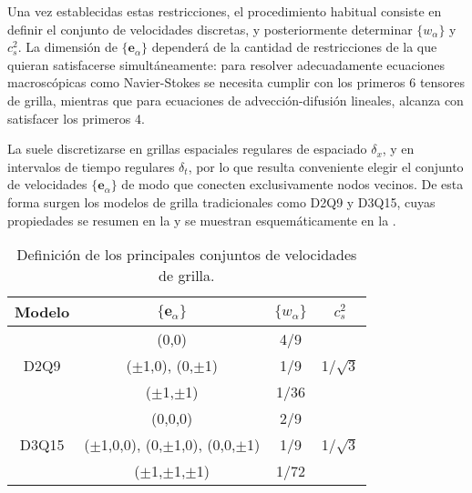 Una vez establecidas estas restricciones, el procedimiento habitual consiste en definir el conjunto de velocidades discretas, y posteriormente determinar $\{w_{\alpha}\}$ y $c_s^2$. La dimensi\'on de $\{ \bm{e}_{\alpha}\}$ depender\'a de la cantidad de restricciones de la  que quieran satisfacerse simult\'aneamente: para resolver adecuadamente ecuaciones macrosc\'opicas como Navier-Stokes se necesita cumplir con los primeros 6 tensores de grilla, mientras que para ecuaciones de advecci\'on-difusi\'on lineales, alcanza con satisfacer los primeros 4.
\par
La  suele discretizarse en grillas espaciales regulares de espaciado $\delta_x$, y en intervalos de tiempo regulares $\delta_t$, por lo que resulta conveniente elegir el conjunto de velocidades $\{ \bm{e}_{\alpha} \}$ de modo que conecten exclusivamente nodos vecinos. De esta forma surgen los modelos de grilla tradicionales como D2Q9 y D3Q15, cuyas propiedades se resumen en la  y se muestran esquem\'aticamente en la .

\begin{table}[ht]
	\centering
    \begin{tabular}{c c c c}
	    \toprule
        \bf Modelo & $\{\bm{e}_{\alpha}\}$ & $\{w_{\alpha}\}$ & $c_s^2$ \\
        \midrule
        \midrule
        \multirow{3}{*}{D2Q9} & (0,0) & 4/9 & \multirow{3}{*}{1/$\sqrt{3}$} \\
                              & ($\pm$1,0), (0,$\pm$1) & 1/9 &  \\
                              & ($\pm$1,$\pm$1) & 1/36 &  \\                              
        \midrule
        \multirow{3}{*}{D3Q15} & (0,0,0) & 2/9 & \multirow{3}{*}{1/$\sqrt{3}$} \\
                               & ($\pm$1,0,0), (0,$\pm$1,0), (0,0,$\pm$1) & 1/9 &  \\
                               & ($\pm$1,$\pm$1,$\pm$1) & 1/72 &  \\         
        \bottomrule
	\end{tabular}
	\caption{Definici\'on de los principales conjuntos de velocidades de grilla.}
	\label{tab:DdQq}
\end{table}  

